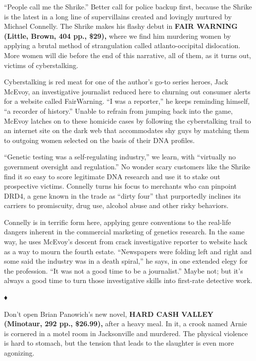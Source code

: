 ``People call me the Shrike.'' Better call for police backup first,
because the Shrike is the latest in a long line of supervillains created
and lovingly nurtured by Michael Connelly. The Shrike makes his flashy
debut in \textbf{FAIR WARNING (Little, Brown, 404 pp., \$29),} where we
find him murdering women by applying a brutal method of strangulation
called atlanto-occipital dislocation. More women will die before the end
of this narrative, all of them, as it turns out, victims of
cyberstalking.

Cyberstalking is red meat for one of the author's go-to series heroes,
Jack McEvoy, an investigative journalist reduced here to churning out
consumer alerts for a website called FairWarning. ``I was a reporter,''
he keeps reminding himself, ``a recorder of history.'' Unable to refrain
from jumping back into the game, McEvoy latches on to these homicide
cases by following the cyberstalking trail to an internet site on the
dark web that accommodates shy guys by matching them to outgoing women
selected on the basis of their DNA profiles.

``Genetic testing was a self-regulating industry,'' we learn, with
``virtually no government oversight and regulation.'' No wonder scary
customers like the Shrike find it so easy to score legitimate DNA
research and use it to stake out prospective victims. Connelly turns his
focus to merchants who can pinpoint DRD4, a gene known in the trade as
``dirty four'' that purportedly inclines its carriers to promiscuity,
drug use, alcohol abuse and other risky behaviors.

Connelly is in terrific form here, applying genre conventions to the
real-life dangers inherent in the commercial marketing of genetics
research. In the same way, he uses McEvoy's descent from crack
investigative reporter to website hack as a way to mourn the fourth
estate. ``Newspapers were folding left and right and some said the
industry was in a death spiral,'' he says, in one extended elegy for the
profession. ``It was not a good time to be a journalist.'' Maybe not;
but it's always a good time to turn those investigative skills into
first-rate detective work.

♦

Don't open Brian Panowich's new novel, \textbf{HARD CASH VALLEY
(Minotaur, 292 pp., \$26.99),} after a heavy meal. In it, a crook named
Arnie is cornered in a motel room in Jacksonville and murdered. The
physical violence is hard to stomach, but the tension that leads to the
slaughter is even more agonizing.

